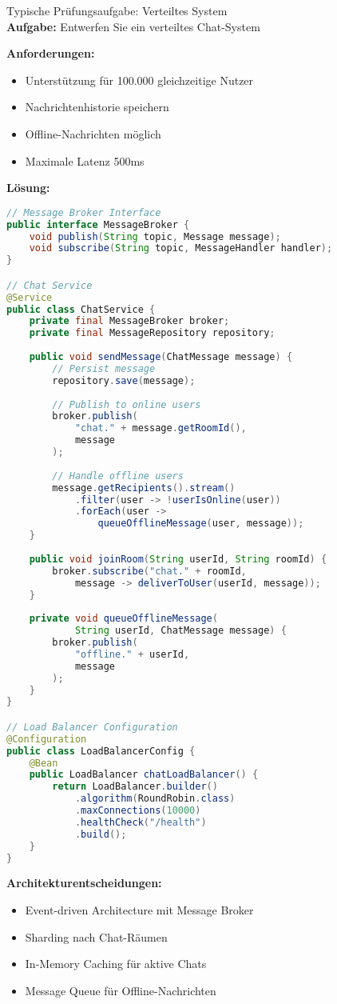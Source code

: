 \begin{example2}{Typische Prüfungsaufgabe: Verteiltes System}\\
\textbf{Aufgabe:} Entwerfen Sie ein verteiltes Chat-System

\textbf{Anforderungen:}
\begin{itemize}
    \item Unterstützung für 100.000 gleichzeitige Nutzer
    \item Nachrichtenhistorie speichern
    \item Offline-Nachrichten möglich
    \item Maximale Latenz 500ms
\end{itemize}

\textbf{Lösung:}
\begin{lstlisting}[language=Java, style=base]
// Message Broker Interface
public interface MessageBroker {
    void publish(String topic, Message message);
    void subscribe(String topic, MessageHandler handler);
}

// Chat Service
@Service
public class ChatService {
    private final MessageBroker broker;
    private final MessageRepository repository;
    
    public void sendMessage(ChatMessage message) {
        // Persist message
        repository.save(message);
        
        // Publish to online users
        broker.publish(
            "chat." + message.getRoomId(), 
            message
        );
        
        // Handle offline users
        message.getRecipients().stream()
            .filter(user -> !userIsOnline(user))
            .forEach(user -> 
                queueOfflineMessage(user, message));
    }
    
    public void joinRoom(String userId, String roomId) {
        broker.subscribe("chat." + roomId, 
            message -> deliverToUser(userId, message));
    }
    
    private void queueOfflineMessage(
            String userId, ChatMessage message) {
        broker.publish(
            "offline." + userId,
            message
        );
    }
}

// Load Balancer Configuration
@Configuration
public class LoadBalancerConfig {
    @Bean
    public LoadBalancer chatLoadBalancer() {
        return LoadBalancer.builder()
            .algorithm(RoundRobin.class)
            .maxConnections(10000)
            .healthCheck("/health")
            .build();
    }
}
\end{lstlisting}

\textbf{Architekturentscheidungen:}
\begin{itemize}
    \item Event-driven Architecture mit Message Broker
    \item Sharding nach Chat-Räumen
    \item In-Memory Caching für aktive Chats
    \item Message Queue für Offline-Nachrichten
\end{itemize}
\end{example2}

